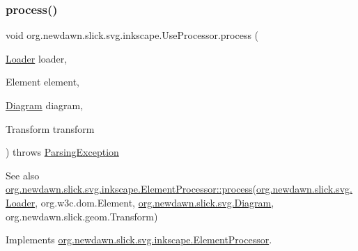 \subsubsection{\texorpdfstring{process()}{process()}}
{\footnotesize\ttfamily void org.\+newdawn.\+slick.\+svg.\+inkscape.\+Use\+Processor.\+process (\begin{DoxyParamCaption}\item[{\mbox{\hyperlink{interfaceorg_1_1newdawn_1_1slick_1_1svg_1_1_loader}{Loader}}}]{loader,  }\item[{Element}]{element,  }\item[{\mbox{\hyperlink{classorg_1_1newdawn_1_1slick_1_1svg_1_1_diagram}{Diagram}}}]{diagram,  }\item[{Transform}]{transform }\end{DoxyParamCaption}) throws \mbox{\hyperlink{classorg_1_1newdawn_1_1slick_1_1svg_1_1_parsing_exception}{Parsing\+Exception}}\hspace{0.3cm}{\ttfamily [inline]}}

\begin{DoxySeeAlso}{See also}
\mbox{\hyperlink{interfaceorg_1_1newdawn_1_1slick_1_1svg_1_1inkscape_1_1_element_processor_acd170a9e1119481edae885780db59a2e}{org.\+newdawn.\+slick.\+svg.\+inkscape.\+Element\+Processor\+::process}}(\mbox{\hyperlink{interfaceorg_1_1newdawn_1_1slick_1_1svg_1_1_loader}{org.\+newdawn.\+slick.\+svg.\+Loader}}, org.\+w3c.\+dom.\+Element, \mbox{\hyperlink{classorg_1_1newdawn_1_1slick_1_1svg_1_1_diagram}{org.\+newdawn.\+slick.\+svg.\+Diagram}}, org.\+newdawn.\+slick.\+geom.\+Transform) 
\end{DoxySeeAlso}


Implements \mbox{\hyperlink{interfaceorg_1_1newdawn_1_1slick_1_1svg_1_1inkscape_1_1_element_processor_acd170a9e1119481edae885780db59a2e}{org.\+newdawn.\+slick.\+svg.\+inkscape.\+Element\+Processor}}.


